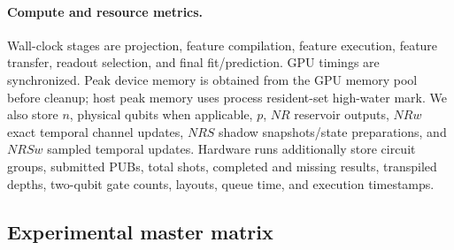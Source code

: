 \paragraph{Compute and resource metrics.}
Wall-clock stages are projection, feature compilation, feature execution,
feature transfer, readout selection, and final fit/prediction.  GPU timings are
synchronized.  Peak device memory is obtained from the GPU memory pool before
cleanup; host peak memory uses process resident-set high-water mark.  We also
store \(n\), physical qubits when applicable, \(p\), \(NR\) reservoir outputs,
\(NRw\) exact temporal channel updates, \(NRS\) shadow snapshots/state
preparations, and \(NRSw\) sampled temporal updates.  Hardware runs additionally
store circuit groups, submitted PUBs, total shots, completed and missing
results, transpiled depths, two-qubit gate counts, layouts, queue time, and
execution timestamps.

\subsection{Experimental master matrix}
\label{app:master-matrix}

